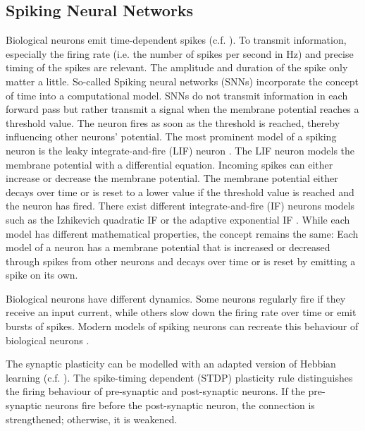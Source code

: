 \subsection{Spiking Neural Networks}
Biological neurons emit time-dependent spikes (c.f. ).
To transmit information, especially the firing rate (i.e. the number of spikes per second in Hz) and precise timing of the spikes are relevant.
The amplitude and duration of the spike only matter a little.
So-called Spiking neural networks (SNNs) incorporate the concept of time into a computational model.
SNNs do not transmit information in each forward pass but rather transmit a signal when the membrane potential reaches a threshold value. 
The neuron fires as soon as the threshold is reached, thereby influencing other neurons' potential.
The most prominent model of a spiking neuron is the leaky integrate-and-fire (LIF) neuron .
The LIF neuron models the membrane potential with a differential equation.
Incoming spikes can either increase or decrease the membrane potential.
The membrane potential either decays over time or is reset to a lower value if the threshold value is reached and the neuron has fired.
There exist different integrate-and-fire (IF) neurons models such as the Izhikevich quadratic IF  or the adaptive exponential IF .
While each model has different mathematical properties, the concept remains the same: Each model of a neuron has a membrane potential that is increased or decreased through spikes from other neurons and decays over time or is reset by emitting a spike on its own.

Biological neurons have different dynamics.
Some neurons regularly fire if they receive an input current, while others slow down the firing rate over time or emit bursts of spikes.
Modern models of spiking neurons can recreate this behaviour of biological neurons .

The synaptic plasticity can be modelled with an adapted version of Hebbian learning (c.f. ).
The spike-timing dependent (STDP) plasticity rule  distinguishes the firing behaviour of pre-synaptic and post-synaptic neurons.
If the pre-synaptic neurons fire before the post-synaptic neuron, the connection is strengthened; otherwise, it is weakened.


